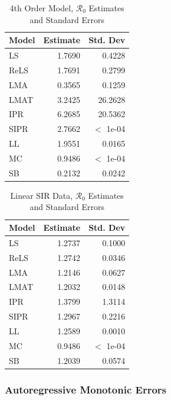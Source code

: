 \documentclass[12pt]{article}
\newcommand{\rr}{\ensuremath{\mathcal{R}_0}}
\begin{document}
\begin{table}[H]
	
	
	\centering
	\begin{tabular}[t]{l|r|r}
		\hline
		Model & Estimate & Std. Dev\\
		\hline
		LS & 1.7690 & 0.4228\\
		\hline
		ReLS & 1.7691 & 0.2799\\
		\hline
		LMA & 0.3565 & 0.1259\\
		\hline
		LMAT & 3.2425 & 26.2628\\
		\hline
		IPR & 6.2685 & 20.5362\\
		\hline
		SIPR & 2.7662 & $<$ 1e-04\\
		\hline
		LL & 1.9551 & 0.0165\\
		\hline
		MC & 0.9486 & $<$ 1e-04\\
		\hline
		SB & 0.2132 & 0.0242\\
		\hline
	\end{tabular}
	\caption{4th Order Model, $\rr$ Estimates and Standard Errors}
\end{table}


\begin{table}[H]
	
	\centering
	\begin{tabular}[t]{l|r|r}
		\hline
		Model & Estimate & Std. Dev\\
		\hline
		LS & 1.2737 & 0.1000\\
		\hline
		ReLS & 1.2742 & 0.0346\\
		\hline
		LMA & 1.2146 & 0.0627\\
		\hline
		LMAT & 1.2032 & 0.0148\\
		\hline
		IPR & 1.3799 & 1.3114\\
		\hline
		SIPR & 1.2967 & 0.2216\\
		\hline
		LL & 1.2589 & 0.0010\\
		\hline
		MC & 0.9486 & $<$ 1e-04\\
		\hline
		SB & 1.2039 & 0.0574\\
		\hline
	\end{tabular}
	\caption{Linear SIR Data, $\rr$ Estimates and Standard Errors}
\end{table}

\subsubsection{Autoregressive Monotonic Errors}
\end{document}
